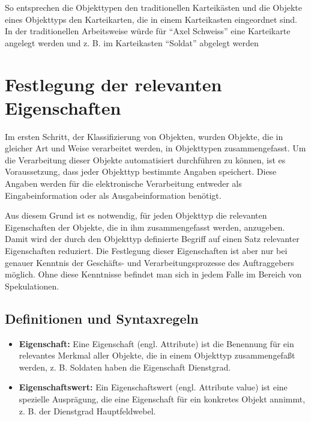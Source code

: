 So entsprechen die Objekttypen den traditionellen Karteikästen und die
Objekte eines Objekttyps den Karteikarten, die in einem Karteikasten
eingeordnet sind. In der traditionellen Arbeitsweise würde für
\enquote{Axel Schweiss} eine Karteikarte angelegt werden und z. B. im
Karteikasten \enquote{Soldat} abgelegt werden
\section{Festlegung der relevanten Eigenschaften}
Im ersten Schritt, der Klassifizierung von Objekten, wurden Objekte, die
in gleicher Art und Weise verarbeitet werden, in Objekttypen
zusammengefasst. Um die Verarbeitung dieser Objekte automatisiert
durchführen zu können, ist es Voraussetzung, dass jeder Objekttyp
bestimmte Angaben speichert. Diese Angaben werden für die elektronische
Verarbeitung entweder als Eingabeinformation oder als Ausgabeinformation
benötigt.

Aus diesem Grund ist es notwendig, für jeden Objekttyp die relevanten
Eigenschaften der Objekte, die in ihm zusammengefasst werden, anzugeben.
Damit wird der durch den Objekttyp definierte Begriff auf einen Satz
relevanter Eigenschaften reduziert. Die Festlegung dieser Eigenschaften
ist aber nur bei genauer Kenntnis der Geschäfts- und
Verarbeitungsprozesse des Auftraggebers möglich. Ohne diese Kenntnisse
befindet man sich in jedem Falle im Bereich von Spekulationen.
\subsection{Definitionen und Syntaxregeln}
\begin{merke}
    \begin{itemize}
        \item \textbf{Eigenschaft:} Eine Eigenschaft (engl. Attribute) ist
              die Benennung für ein relevantes Merkmal aller Objekte, die in
              einem Objekttyp zusammengefaßt werden, z. B. Soldaten haben die
              Eigenschaft Dienstgrad.
        \item \textbf{Eigenschaftswert:} Ein Eigenschaftswert (engl.
              Attribute value) ist eine spezielle Ausprägung, die eine
              Eigenschaft für ein konkretes Objekt annimmt, z. B. der Dienstgrad
              Hauptfeldwebel.
    \end{itemize}
\end{merke}


